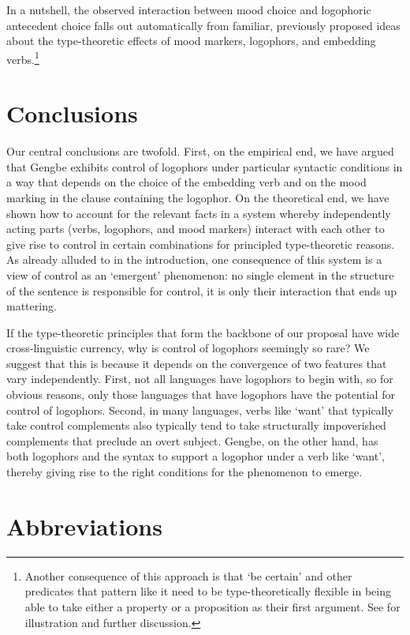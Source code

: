 \documentclass[output=paper
,modfonts
,nonflat]{langsci/langscibook}
\newcommand{\á}{\'{ã}}
\newcommand{\É}{\'{\~{ε}}}
\newcommand{\È}{\`{\~{ε}}}
\newcommand{\í}{\'{\~{i}}}
\newcommand{\ì}{\`{\~{i}}}
\newcommand{\Ó}{\'{\~{ɔ}}}
\newcommand{\Ò}{\`{\~{ɔ}}}
\newcommand{\ú}{\'{ũ}}
\newcommand{\ù}{\`{ũ}}
\begin{document}
In a nutshell, the observed interaction between mood choice and logophoric antecedent choice falls out automatically from familiar, previously proposed ideas about the type-theoretic effects of mood markers, logophors, and embedding verbs.\footnote{Another consequence of this approach is that `be certain' and other predicates that pattern like it  need to be type-theoretically flexible in being able to take either a property or a proposition as their first argument. See \citealt{gl17} for illustration and further discussion.}




\section{Conclusions}

Our central conclusions are twofold. First, on the empirical end, we have argued that Gengbe exhibits  control of logophors under particular syntactic conditions in a way that depends on the choice of the embedding verb and on the mood marking in the clause containing the logophor. On the theoretical end, we have shown how to account for the relevant facts in a system whereby independently acting parts (verbs, logophors, and mood markers)  interact with each other to give rise to control in certain combinations for principled type-theoretic reasons. As already alluded to in the introduction, one consequence of this system is a view of control as an `emergent' phenomenon: no single element in the structure of the sentence is responsible for control, it is only their interaction that ends up mattering.

If the type-theoretic principles that form the backbone of our proposal have wide cross-linguistic currency, why is control of logophors seemingly so rare?  We suggest that this is because it depends on the convergence of two features that vary independently. First, not all languages have logophors to begin with, so for obvious reasons, only those languages that have logophors have the potential for control of logophors. Second, in many languages, verbs like `want' that typically take control complements also typically tend to take structurally impoverished complements that preclude an overt subject. Gengbe, on the other hand, has both logophors and the syntax to support a logophor under a verb like `want', thereby giving rise to the right conditions for the phenomenon to emerge.


\section*{Abbreviations}
\end{document}
